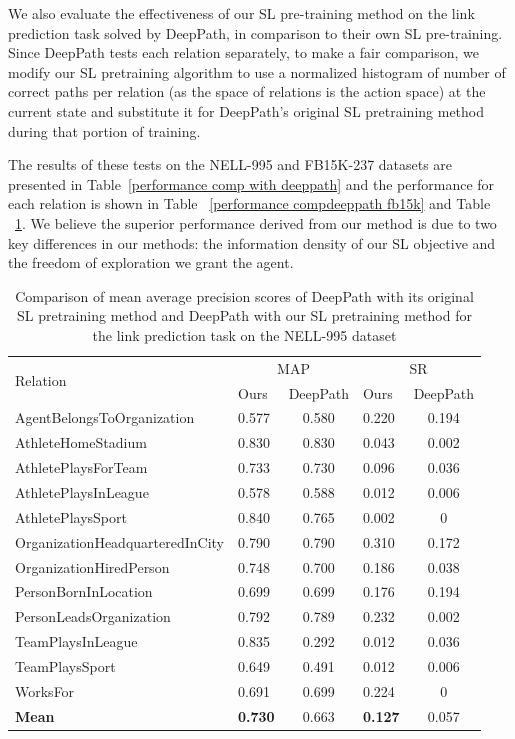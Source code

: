\documentclass[lettersize,journal]{IEEEtran}
\begin{document}
\begin{table}
\label{performance compdeeppath fb15k}
\end{table}


We also evaluate the effectiveness of our SL pre-training method on the link prediction task solved by DeepPath, in comparison to their own SL pre-training. Since DeepPath tests each relation separately, to make a fair comparison, we modify our SL pretraining algorithm to use a normalized histogram of number of correct paths per relation (as the space of relations is the action space) at the current state and substitute it for DeepPath's original SL pretraining method during that portion of training.

The results of these tests on the NELL-995 and FB15K-237 datasets are presented in Table~\ref{performance comp with deeppath} and the performance for each relation is shown in Table ~\ref{performance compdeeppath fb15k} and Table ~\ref{performance compdeeppath nell}. We believe the superior performance derived from our method is due to two key differences in our methods: the information density of our SL objective and the freedom of exploration we grant the agent. 






\begin{table}
\centering

\caption{Comparison of mean average precision scores of DeepPath with its original SL pretraining method and DeepPath with our SL pretraining method for the link prediction task on the NELL-995 dataset}
\begin{tabular}{lp{}cp{}c}
\hline 
\multirow{2}{4em}{Relation} & \multicolumn{2}{c}{MAP}  &\multicolumn{2}{c}{SR} \\
&Ours&DeepPath&Ours&DeepPath\\
\hline
AgentBelongsToOrganization&0.577&0.580&0.220&0.194\\
AthleteHomeStadium&0.830&0.830&0.043&0.002\\
AthletePlaysForTeam&0.733&0.730&0.096&0.036\\
AthletePlaysInLeague&0.578&0.588&0.012&0.006\\
AthletePlaysSport&0.840&0.765&0.002&0\\
OrganizationHeadquarteredInCity&0.790&0.790&0.310&0.172\\
OrganizationHiredPerson&0.748&0.700&0.186&0.038\\
PersonBornInLocation&0.699&0.699&0.176&0.194\\
PersonLeadsOrganization&0.792&0.789&0.232&0.002\\
TeamPlaysInLeague&0.835&0.292&0.012&0.036\\
TeamPlaysSport&0.649&0.491&0.012&0.006\\
WorksFor&0.691&0.699&0.224&0\\
\hline
\textbf{Mean}&\textbf{0.730}&0.663&\textbf{0.127}&0.057\\
\hline

\end{tabular}

\label{performance compdeeppath nell}
\end{table}
\end{document}
